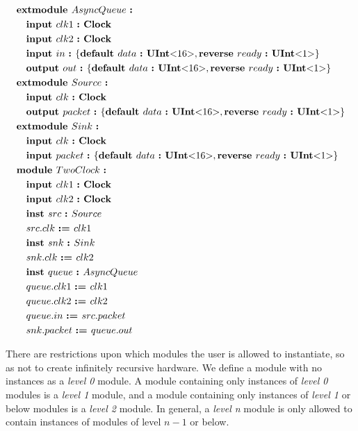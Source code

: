 \documentclass[12pt]{article}
\begin{document}
{ \fontsize{11pt}{1.15em}\selectfont
\[
\begin{aligned}
&\kw{extmodule} AsyncQueue \ \kws{:} \\
&\quad \kw{input} clk1 \ \kw{:} \kws{Clock} \\
&\quad \kw{input} clk2 \ \kw{:} \kws{Clock} \\
&\quad \kw{input} in  \ \kw{:} \bundleT{\kw{default} data \ \kw{:} \kws{UInt$<$}16\kws{$>$},\kw{reverse} ready \ \kw{:} \kws{UInt$<$}1\kws{$>$}} \\
&\quad \kw{output} out  \ \kw{:} \bundleT{\kw{default} data \ \kw{:} \kws{UInt$<$}16\kws{$>$},\kw{reverse} ready \ \kw{:} \kws{UInt$<$}1\kws{$>$}} \\
&\kw{extmodule} Source \ \kws{:} \\
&\quad \kw{input} clk \ \kw{:} \kws{Clock} \\
&\quad \kw{output} packet  \ \kw{:} \bundleT{\kw{default} data \ \kw{:} \kws{UInt$<$}16\kws{$>$},\kw{reverse} ready \ \kw{:} \kws{UInt$<$}1\kws{$>$}} \\
&\kw{extmodule} Sink \ \kws{:} \\
&\quad \kw{input} clk \ \kw{:} \kws{Clock} \\
&\quad \kw{input} packet  \ \kw{:} \bundleT{\kw{default} data \ \kw{:} \kws{UInt$<$}16\kws{$>$},\kw{reverse} ready \ \kw{:} \kws{UInt$<$}1\kws{$>$}} \\
&\kw{module} TwoClock \ \kws{:} \\
&\quad \kw{input} clk1 \ \kw{:} \kws{Clock} \\
&\quad \kw{input} clk2 \ \kw{:} \kws{Clock} \\
&\quad \kw{inst} src \ \kw{:} Source \\
&\quad src.clk \ \kw{:=} clk1 \\
&\quad \kw{inst} snk \ \kw{:} Sink \\
&\quad snk.clk \ \kw{:=} clk2 \\
&\quad \kw{inst} queue \ \kw{:} AsyncQueue \\
&\quad queue.clk1 \ \kw{:=} clk1 \\
&\quad queue.clk2 \ \kw{:=} clk2 \\
&\quad queue.in \ \kw{:=} src.packet \\
&\quad snk.packet \ \kw{:=} queue.out \\
\end{aligned}
\]
}

There are restrictions upon which modules the user is allowed to instantiate, so as not to create infinitely recursive hardware.
We define a module with no instances as a {\em level 0} module.
A module containing only instances of {\em level 0} modules is a {\em level 1} module, and a module containing only instances of {\em level 1} or below modules is a {\em level 2} module.
In general, a {\em level n} module is only allowed to contain instances of modules of level $n-1$ or below. 
\end{document}
